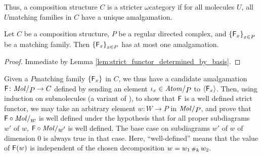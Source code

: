 \begin{rmk}
    Thus, a composition structure \( C \) is a stricter \( \omega \)\nbd category if for all molecules \( U \), all \( U \)\nbd matching families in \( C \) have a unique amalgamation.
\end{rmk}

\begin{lem}\label{lem:at_most_one_lift}
    Let \( C \) be a composition structure, \( P \) be a regular directed complex, and \( \left\{ {\mathsf{F}_x} \right\}_{x \in P} \) be a matching family. 
    Then \( \left\{ {\mathsf{F}_x} \right\}_{x \in P} \) has at most one amalgamation.
\end{lem}
\begin{proof}
    Immediate by Lemma \ref{lem:strict_functor_determined_by_basis}.
\end{proof}

\begin{comm} \label{comm:well_defined_amalgamation}
    Given a \( P \)\nbd matching family \( \left\{ {\mathsf{F}_x} \right\} \) in \( C \), we thus have a candidate amalgamation \( \F \colon \molecin{P} \to C \) defined by sending an element \( \mapel{x} \in \atomin{P} \) to \( \langle\mathsf{F}_x\rangle \).
    Then, using induction on submolecules (a variant of \cite[Comment 4.1.7]{hadzihasanovic2024combinatorics}), to show that \( \mathsf{F} \) is a well defined strict functor, we may take an arbitrary element \( w \colon W \to P \) in \( \molecin{P} \), and prove that \( \F \after \molecin{w} \) is well defined under the hypothesis that for all proper subdiagrams \( w' \) of \( w \), \( \F \after \molecin{w'} \) is well defined. 
    The base case on subdiagrams \( w' \) of \( w \) of dimension \( 0 \) is always true in that case.
    Here, ``well-defined'' means that the value of \( \mathsf{F}(w) \) is independent of the chosen decomposition \( w = w_1 \,{\scriptstyle\#}_{k}\, w_2 \).
\end{comm}

